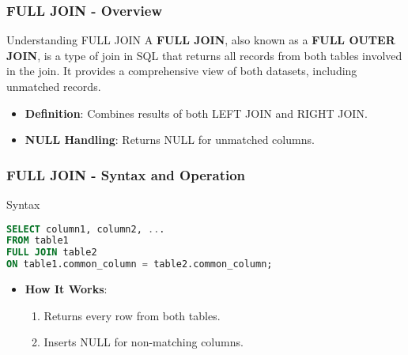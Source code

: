 \documentclass[aspectratio=169]{beamer}
\begin{document}
\begin{frame}[fragile]
    \frametitle{FULL JOIN - Overview}
    \begin{block}{Understanding FULL JOIN}
        A \textbf{FULL JOIN}, also known as a \textbf{FULL OUTER JOIN}, is a type of join in SQL that returns all records from both tables involved in the join. It provides a comprehensive view of both datasets, including unmatched records.
    \end{block}
    
    \begin{itemize}
        \item \textbf{Definition}: Combines results of both LEFT JOIN and RIGHT JOIN.
        \item \textbf{NULL Handling}: Returns NULL for unmatched columns.
    \end{itemize}
\end{frame}

\begin{frame}[fragile]
    \frametitle{FULL JOIN - Syntax and Operation}
    \begin{block}{Syntax}
    \begin{lstlisting}[language=SQL]
SELECT column1, column2, ...
FROM table1
FULL JOIN table2
ON table1.common_column = table2.common_column;
    \end{lstlisting}
    \end{block}
    
    \begin{itemize}
        \item \textbf{How It Works}:
            \begin{enumerate}
                \item Returns every row from both tables.
                \item Inserts NULL for non-matching columns.
            \end{enumerate}
    \end{itemize}
\end{frame}
\end{document}
